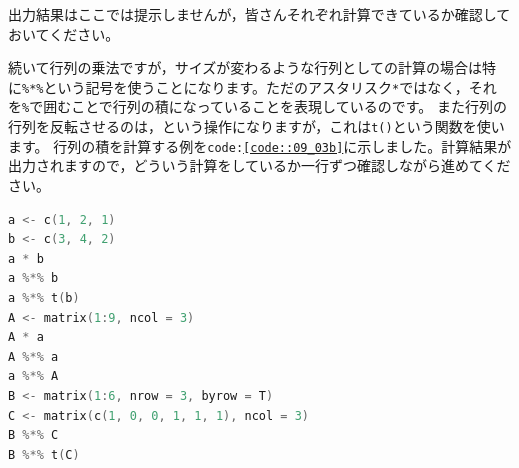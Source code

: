 \documentclass{ltjsbook}
\begin{document}
出力結果はここでは提示しませんが，皆さんそれぞれ計算できているか確認しておいてください。

続いて行列の乗法ですが，サイズが変わるような行列としての計算の場合は特に\verb|%*%|という記号を使うことになります。ただのアスタリスク\verb|*|ではなく，それを\verb|%|で囲むことで行列の積になっていることを表現しているのです。
また行列の行列を反転させるのは，という操作になりますが，これは\texttt{t()}という関数を使います。
行列の積を計算する例を\texttt{code:\ref{code::09_03b}}に示しました。計算結果が出力されますので，どういう計算をしているか一行ずつ確認しながら進めてください。

\begin{lstlisting}[language=c++,label={code::09_03b},caption={行列の積}]
a <- c(1, 2, 1)
b <- c(3, 4, 2)
a * b
a %*% b
a %*% t(b)
A <- matrix(1:9, ncol = 3)
A * a
A %*% a
a %*% A
B <- matrix(1:6, nrow = 3, byrow = T)
C <- matrix(c(1, 0, 0, 1, 1, 1), ncol = 3)
B %*% C
B %*% t(C)
\end{lstlisting}
\end{document}
